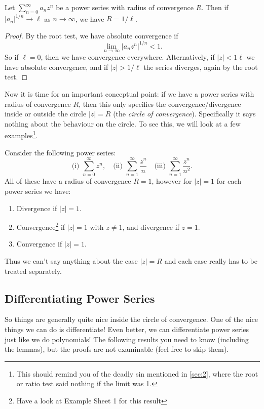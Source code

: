 \begin{lemma}
	Let $\sum_{n = 0}^{\infty} a_n z^n$ be a power series with radius of convergence $R$.
	Then if $|a_{n}|^{1/n} \rightarrow \ell$ as $n \rightarrow \infty$, we have $R = 1/\ell$.
\end{lemma}
\begin{proof}
	By the root test, we have absolute convergence if
	$$
	\lim_{n \to \infty} |a_n z^n|^{1/n} < 1.
	$$
	So if $\ell = 0$, then we have convergence everywhere. Alternatively, if $|z| < 1\ell$ we have absolute convergence, and if $|z| > 1/\ell$ the series diverges, again by the root test.
\end{proof}

Now it is time for an important conceptual point: if we have a power series with radius of convergence $R$, then this only specifies the convergence/divergence inside or outside the circle $|z| = R$ (the \emph{circle of convergence}). Specifically {\color{red} it says nothing about the behaviour on the circle.} To see this, we will look at a few examples\footnote{This should remind you of the deadly sin mentioned in \autoref{sec:2}, where the root or ratio test said nothing if the limit was 1.}.

\begin{example}[Convergence on $|z| = R$]
	Consider the following power series:
	$$
	\text{(i) }\sum_{n = 0}^{\infty} z^n, \quad \text{(ii) }\sum_{n = 1}^\infty \frac{z^n}{n}\quad \text{(iii) }\sum_{n = 1}^\infty \frac{z^n}{n^2}.
	$$
	All of these have a radius of convergence $R = 1$, however for $|z| = 1$ for each power series we have:
	\begin{enumerate}
		\item Divergence if $|z| = 1$.
		\item Convergence\footnote{Have a look at Example Sheet 1 for this result} if $|z| = 1$ with $z \neq 1$, and divergence if $z = 1$.
		\item Convergence if $|z| = 1$.
	\end{enumerate}
	Thus we can't say anything about the case $|z| = R$ and each case really has to be treated separately.
\end{example}

\subsection{Differentiating Power Series}

So things are generally quite nice inside the circle of convergence. One of the nice things we can do is differentiate! Even better, we can differentiate power series just like we do polynomials!
The following results you need to know (including the lemmas), but the proofs are not examinable (feel free to skip them).

